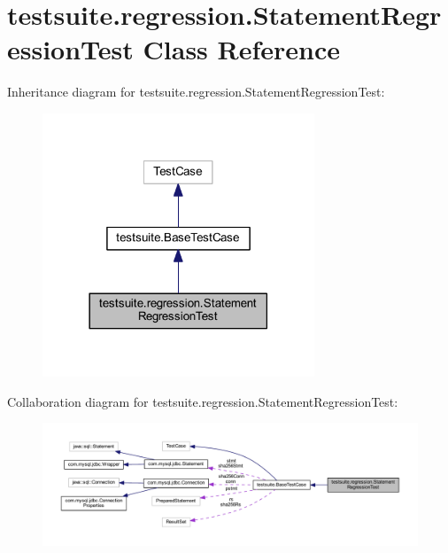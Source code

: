\hypertarget{classtestsuite_1_1regression_1_1_statement_regression_test}{}\section{testsuite.\+regression.\+Statement\+Regression\+Test Class Reference}
\label{classtestsuite_1_1regression_1_1_statement_regression_test}


Inheritance diagram for testsuite.\+regression.\+Statement\+Regression\+Test\+:
\nopagebreak
\begin{figure}[H]
\begin{center}
\leavevmode
\includegraphics[width=230pt]{classtestsuite_1_1regression_1_1_statement_regression_test__inherit__graph}
\end{center}
\end{figure}


Collaboration diagram for testsuite.\+regression.\+Statement\+Regression\+Test\+:
\nopagebreak
\begin{figure}[H]
\begin{center}
\leavevmode
\includegraphics[width=350pt]{classtestsuite_1_1regression_1_1_statement_regression_test__coll__graph}
\end{center}
\end{figure}
